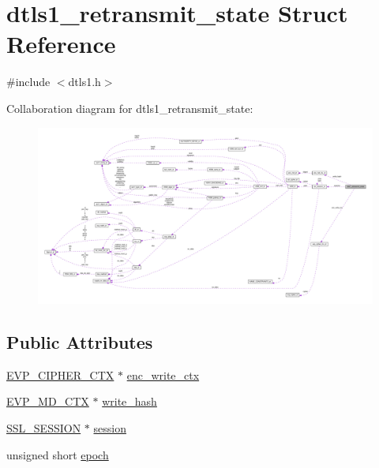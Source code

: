\hypertarget{structdtls1__retransmit__state}{}\section{dtls1\+\_\+retransmit\+\_\+state Struct Reference}
\label{structdtls1__retransmit__state}


{\ttfamily \#include $<$dtls1.\+h$>$}



Collaboration diagram for dtls1\+\_\+retransmit\+\_\+state\+:
\nopagebreak
\begin{figure}[H]
\begin{center}
\leavevmode
\includegraphics[width=350pt]{structdtls1__retransmit__state__coll__graph}
\end{center}
\end{figure}
\subsection*{Public Attributes}
\begin{DoxyCompactItemize}
\item 
\hyperlink{ossl__typ_8h_aab2bd6a044e1d31ebc2fe82b3b0b3d9a}{E\+V\+P\+\_\+\+C\+I\+P\+H\+E\+R\+\_\+\+C\+TX} $\ast$ \hyperlink{structdtls1__retransmit__state_ae1e9d630767c9f03cbbdf719fb84d05f}{enc\+\_\+write\+\_\+ctx}
\item 
\hyperlink{ossl__typ_8h_a69cda4d21bd068f01c469222c1dd92fe}{E\+V\+P\+\_\+\+M\+D\+\_\+\+C\+TX} $\ast$ \hyperlink{structdtls1__retransmit__state_aabb799421e4698d91594730ac7758f7a}{write\+\_\+hash}
\item 
\hyperlink{ssl_8h_a8dd6b81bbcb1b2d769235c37779d2a94}{S\+S\+L\+\_\+\+S\+E\+S\+S\+I\+ON} $\ast$ \hyperlink{structdtls1__retransmit__state_ad953293227cf8db42778e560516d160f}{session}
\item 
unsigned short \hyperlink{structdtls1__retransmit__state_a8a8ac3e9aaaeee2fe91f54ad027f17a9}{epoch}
\end{DoxyCompactItemize}


